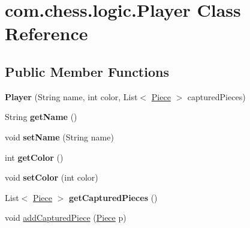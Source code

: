 \hypertarget{classcom_1_1chess_1_1logic_1_1_player}{}\section{com.\+chess.\+logic.\+Player Class Reference}
\label{classcom_1_1chess_1_1logic_1_1_player}
\subsection*{Public Member Functions}
\begin{DoxyCompactItemize}
\item 
\mbox{\label{classcom_1_1chess_1_1logic_1_1_player_a9bc8b9f9006f203e1be80212cd9f03ac}} 
{\bfseries Player} (String name, int color, List$<$ \mbox{\hyperlink{classcom_1_1chess_1_1pieces_1_1_piece}{Piece}} $>$ captured\+Pieces)
\item 
\mbox{\label{classcom_1_1chess_1_1logic_1_1_player_a0221dc20dc08554cb020a6e6c463e7d5}} 
String {\bfseries get\+Name} ()
\item 
\mbox{\label{classcom_1_1chess_1_1logic_1_1_player_a75a09adb7def4bd2a826fc7d50ea08aa}} 
void {\bfseries set\+Name} (String name)
\item 
\mbox{\label{classcom_1_1chess_1_1logic_1_1_player_af4ed49b858e1dc092d4cdb4d0c124a55}} 
int {\bfseries get\+Color} ()
\item 
\mbox{\label{classcom_1_1chess_1_1logic_1_1_player_a5bc9855c91536e71764fd01d333aa7b1}} 
void {\bfseries set\+Color} (int color)
\item 
\mbox{\label{classcom_1_1chess_1_1logic_1_1_player_a58cc2fed14ff29ebc9d9ab13622523ba}} 
List$<$ \mbox{\hyperlink{classcom_1_1chess_1_1pieces_1_1_piece}{Piece}} $>$ {\bfseries get\+Captured\+Pieces} ()
\item 
void \mbox{\hyperlink{classcom_1_1chess_1_1logic_1_1_player_a7da022049a5be05d78805f669ae083bd}{add\+Captured\+Piece}} (\mbox{\hyperlink{classcom_1_1chess_1_1pieces_1_1_piece}{Piece}} p)
\end{DoxyCompactItemize}



